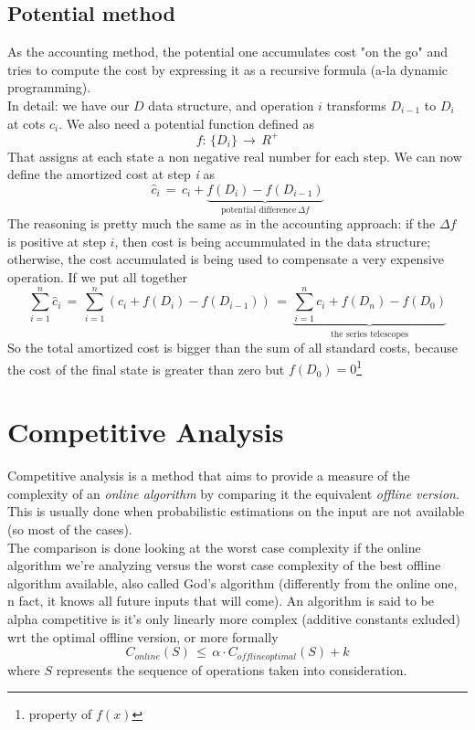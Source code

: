 \documentclass{article}
\begin{document}
		\subsection{Potential method}
			As the accounting method, the potential one accumulates cost "on the go" and tries to compute the cost by expressing it as a recursive formula (a-la dynamic programming).\\
			In detail: we have our $D$ data structure, and operation $i$ transforms $D_{i - 1}$ to $D_i$ at cots $c_i$. We also need a potential function defined as
			\begin{equation}
				f:\, \{D_i\}\, \rightarrow\, R^+
			\end{equation}
			That assigns at each state a non negative real number for each step. We can now define the amortized cost at step \emph{i} as
			\begin{equation}
				\hat{c}_i \,=\, c_i + \underbrace{f(D_i) - f(D_{i-1})}_{\text{potential difference}\, \Delta f}
			\end{equation}
			The reasoning is pretty much the same as in the accounting approach: if the $\Delta f$ is positive at step $i$, then cost is being accummulated in the data structure; otherwise, the cost accumulated is being used to compensate a very expensive operation. If we put all together
			\begin{equation}
				\sum_{i = 1}^n\hat{c}_i \,=\, \sum_{i = 1}^n(c_i + f(D_i) - f(D_{i - 1})) \,=\, \underbrace{\sum_{i = 1}^nc_i + f(D_n) - f(D_0)}_{\text{the series telescopes}}
			\end{equation}
			So the total amortized cost is bigger than the sum of all standard costs, because the cost of the final state is greater than zero but $f(D_0) = 0$\footnote{property of $f(x)$}
	
	\section{Competitive Analysis}
		Competitive analysis is a method that aims to provide a measure of the complexity of an \textit{online algorithm} by comparing it the equivalent \textit{offline version}. This is usually done when probabilistic estimations on the input are not available (so most of the cases).\\
		The comparison is done looking at the worst case complexity if the online algorithm we're analyzing versus the worst case complexity of the best offline algorithm available, also called God's algorithm (differently from the online one, n fact, it knows all future inputs that will come). An algorithm is said to be alpha competitive is it's only linearly more complex (additive constants exluded) wrt the optimal offline version, or more formally
		\begin{equation}
			C_{online}(S) \,\leq\, \alpha \cdot C_{offline optimal}(S) + k
		\end{equation}
		where $S$ represents the sequence of operations taken into consideration.
\end{document}

